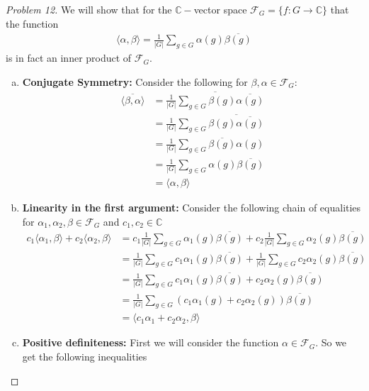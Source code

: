 \documentclass[titlepage]{article}
\theoremstyle{plain}
\theoremstyle{definition}
\theoremstyle{remark}
\theoremstyle{exercise-style}
\numberwithin{equation}{section}
\numberwithin{theorem}{section}
\numberwithin{remark}{section}
\begin{document}
\begin{proof}[Problem 12]
    We will show that for the $\mathbb C-$vector space $\mathcal{F}_G = \{ f : G \to \mathbb C \}$ that the function 
    \begin{align}
        \langle \alpha , \beta \rangle = \frac{1}{|G|} \sum_{g \in G} \alpha(g) \overline{\beta(g)}
    \end{align}
    is in fact an inner product of $\mathcal{F}_G$.
    \begin{enumerate}[(a)]
        \item \textbf{Conjugate Symmetry:} Consider the following for $\beta, \alpha \in \mathcal{F}_G$:
        \begin{align}
            \overline{\langle \beta, \alpha \rangle} &= \overline{\frac{1}{|G|} \sum_{g \in G} \beta(g) \overline{\alpha(g)}} \\
            &= \frac{1}{|G|} \sum_{g \in G} \overline{\beta(g) \overline{\alpha(g)}} \\
            &= \frac{1}{|G|} \sum_{g \in G} \overline{\beta(g)} \alpha(g) \\
            &= \frac{1}{|G|} \sum_{g \in G}  \alpha(g)\overline{\beta(g)} \\
            &= \langle \alpha , \beta \rangle
        \end{align}
        \item \textbf{Linearity in the first argument:} Consider the following chain of equalities for $\alpha_1 , \alpha_2, \beta \in \mathcal{F}_G$ and $c_1, c_2 \in \mathbb{C}$
        \begin{align}
            c_1 \langle \alpha_1 , \beta \rangle + c_2 \langle \alpha_2 , \beta \rangle &= c_1\frac{1}{|G|} \sum_{g \in G}  \alpha_1(g)\overline{\beta(g)} + c_2\frac{1}{|G|} \sum_{g \in G}  \alpha_2(g)\overline{\beta(g)} \\
            &= \frac{1}{|G|} \sum_{g \in G}  c_1\alpha_1(g)\overline{\beta(g)} + \frac{1}{|G|} \sum_{g \in G}  c_2\alpha_2(g)\overline{\beta(g)} \\
            &= \frac{1}{|G|} \sum_{g \in G}  c_1\alpha_1(g)\overline{\beta(g)} + c_2\alpha_2(g)\overline{\beta(g)} \\
            &= \frac{1}{|G|} \sum_{g \in G}  (c_1\alpha_1(g) + c_2\alpha_2(g))\overline{\beta(g)} \\
            &= \langle c_1 \alpha_1 + c_2 \alpha_2, \beta \rangle
        \end{align}
        \item \textbf{Positive definiteness:} First we will consider the function $\alpha \in \mathcal{F}_G$. So we get the following inequalities

\end{enumerate}
\end{proof}
\end{document}
